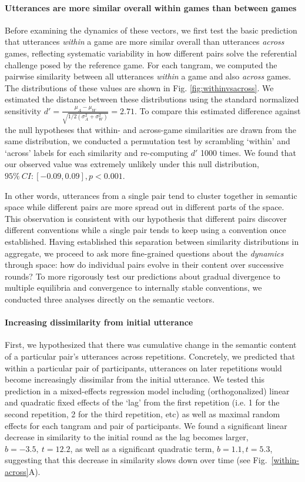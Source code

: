 \paragraph{Utterances are more similar overall within games than between games}  
Before examining the dynamics of these vectors, we first test the basic prediction that utterances \emph{within} a game are more similar overall than utterances \emph{across} games, reflecting systematic variability in how different pairs solve the referential challenge posed by the reference game.
For each tangram, we computed the pairwise similarity between all utterances \emph{within} a game and also \emph{across} games. 
The distributions of these values are shown in Fig. \ref{fig:withinvsacross}.
We estimated the distance between these distributions using the standard normalized sensitivity $d' = \frac{\mu_A - \mu_W}{\sqrt{1/2(\sigma^2_A+\sigma^2_W)}} = 2.71$.
To compare this estimated difference against the null hypotheses that within- and across-game similarities are drawn from the same distribution, we conducted a permutation test by scrambling `within' and `across' labels for each similarity and re-computing $d'$ 1000 times. 
We found that our observed value was extremely unlikely under this null distribution, $95\%~CI: [-0.09, 0.09], p < 0.001$. 

In other words, utterances from a single pair tend to cluster together in semantic space while different pairs are more spread out in different parts of the space.
This observation is consistent with our hypothesis that different pairs discover different conventions while a single pair tends to keep using a convention once established.
Having established this separation between similarity distributions in aggregate, we proceed to ask more fine-grained questions about the \emph{dynamics} through space: how do individual pairs evolve in their content over successive rounds?
To more rigorously test our predictions about gradual divergence to multiple equilibria and convergence to internally stable conventions, we conducted three analyses directly on the semantic vectors.

\paragraph{Increasing dissimilarity from initial utterance}

First, we hypothesized that there was cumulative change in the semantic content of a particular pair's utterances across repetitions.
Concretely, we predicted that within a particular pair of participants, utterances on later repetitions would become increasingly dissimilar from the initial utterance.
We tested this prediction in a mixed-effects regression model including (orthogonalized) linear and quadratic fixed effects of the `lag' from the first repetition (i.e. 1 for the second repetition, 2 for the third repetition, etc) as well as maximal random effects for each tangram and pair of participants.
We found a significant linear decrease in similarity to the initial round as the lag becomes larger, $b = -3.5,~t = 12.2$, as well as a significant quadratic term, $b=1.1, t=5.3$, suggesting that this decrease in similarity slows down over time (see Fig.~\ref{within-across}A).

